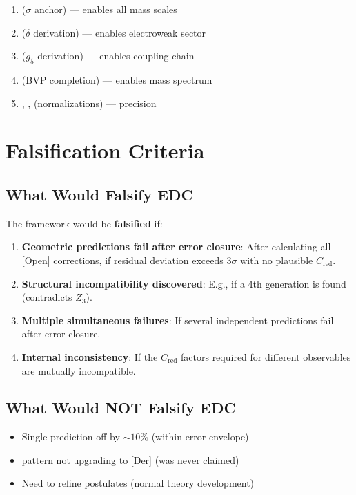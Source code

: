 \begin{enumerate}[nosep]
\item {} ($\sigma$ anchor) --- enables all mass scales
\item {} ($\delta$ derivation) --- enables electroweak sector
\item {} ($g_5$ derivation) --- enables coupling chain
\item {} (BVP completion) --- enables mass spectrum
\item {}, ,  (normalizations) --- precision
\end{enumerate}

\section{Falsification Criteria}
\label{sec:falsification}

\subsection{What Would Falsify EDC}

The framework would be \textbf{falsified} if:

\begin{enumerate}
\item \textbf{Geometric predictions fail after error closure}:
After calculating all [Open] corrections, if residual deviation
exceeds $3\sigma$ with no plausible $C_{\text{red}}$.

\item \textbf{Structural incompatibility discovered}:
E.g., if a 4th generation is found (contradicts $Z_3$).

\item \textbf{Multiple simultaneous failures}:
If several independent predictions fail after error closure.

\item \textbf{Internal inconsistency}:
If the $C_{\text{red}}$ factors required for different observables
are mutually incompatible.
\end{enumerate}

\subsection{What Would NOT Falsify EDC}

\begin{itemize}[nosep]
\item Single prediction off by $\sim 10\%$ (within error envelope)
\item [I] pattern not upgrading to [Der] (was never claimed)
\item Need to refine postulates (normal theory development)
\end{itemize}

